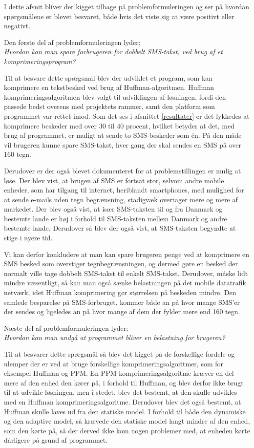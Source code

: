 I dette afsnit bliver der kigget tilbage på problemformuleringen og ser på hvordan spørgsmålene er blevet besvaret, både hvis det viste sig at være positivt eller negativt.

Den første del af problemformuleringen lyder;\\
\emph{Hvordan kan man spare forbrugeren for dobbelt SMS-takst, ved brug af et komprimeringsprogram?}
 
Til at besvare dette spørgsmål blev der udviklet et program, som kan komprimere en tekstbesked ved brug af Huffman-algoritmen. Huffman komprimeringsalgoritmen blev valgt til udviklingen af løsningen, fordi den passede bedst overens med projektets rammer, samt den platform som programmet var rettet imod. Som det ses i afsnittet \ref{resultater} er det lykkedes at komprimere beskeder med over 30 til 40 procent, hvilket betyder at det, med brug af programmet, er muligt at sende to SMS-beskeder som én. På den måde vil brugeren kunne spare SMS-takst, hver gang der skal sendes en SMS på over 160 tegn.
 
Derudover er der også blevet dokumenteret for at problemstillingen er mulig at løse. Der blev vist, at brugen af SMS er fortsat stor, selvom andre mobile enheder, som har tilgang til internet, heriblandt smartphones, med mulighed for at sende e-mails uden tegn begrænsning, stadigvæk overtager mere og mere af markedet. Der blev også vist, at især SMS-taksten til og fra Danmark og bestemte lande er høj i forhold til SMS-taksten mellem Danmark og andre bestemte lande. Derudover så blev der også vist, at SMS-taksten begyndte at stige i nyere tid.
 
Vi kan derfor konkludere at man kan spare brugeren penge ved at komprimere en SMS besked som overstiger tegnbegrænsningen, og dermed gøre en besked der normalt ville tage dobbelt SMS-takst til enkelt SMS-takst. Derudover, måske lidt mindre væsentligt, så kan man også sænke belastningen på det mobile datatrafik netværk, idet Huffman komprimering gør størrelsen på beskeden mindre. Den samlede besparelse på SMS-forbruget, kommer både an på hvor mange SMS'er der sendes og ligeledes an på hvor mange af dem der fylder mere end 160 tegn.

Næste del af problemformuleringen lyder;\\
\emph{Hvordan kan man undgå at programmet bliver en belastning for brugeren?} 

Til at besvarer dette spørgsmål så blev det kigget på de forskellige fordele og ulemper der er ved at bruge forskellige komprimeringsalgoritmer, som for eksempel Huffman og PPM. En PPM komprimeringsalgoritme kræver en del mere af den enhed den kører på, i forhold til Huffman, og blev derfor ikke brugt til at udvikle løsningen, men i stedet, blev det bestemt, at den skulle udvikles med en Huffman komprimeringsalgoritme. Derudover blev det også bestemt, at Huffman skulle laves ud fra den statiske model. I forhold til både den dynamiske og den adaptive model, så krævede den statiske model langt mindre af den enhed, som den kørte på, så der derved ikke kom nogen problemer med, at enheden kørte dårligere på grund af programmet. 

